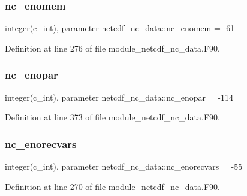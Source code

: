 \subsubsection{\texorpdfstring{nc\+\_\+enomem}{nc\_enomem}}
{\footnotesize\ttfamily integer(c\+\_\+int), parameter netcdf\+\_\+nc\+\_\+data\+::nc\+\_\+enomem = -\/61}



Definition at line 276 of file module\+\_\+netcdf\+\_\+nc\+\_\+data.\+F90.

\mbox{\label{namespacenetcdf__nc__data_aef244b9b47636b8dbe5895eca0b18136}} 
\subsubsection{\texorpdfstring{nc\+\_\+enopar}{nc\_enopar}}
{\footnotesize\ttfamily integer(c\+\_\+int), parameter netcdf\+\_\+nc\+\_\+data\+::nc\+\_\+enopar = -\/114}



Definition at line 373 of file module\+\_\+netcdf\+\_\+nc\+\_\+data.\+F90.

\mbox{\label{namespacenetcdf__nc__data_ac9cf156c3357804270d95bef39921992}} 
\subsubsection{\texorpdfstring{nc\+\_\+enorecvars}{nc\_enorecvars}}
{\footnotesize\ttfamily integer(c\+\_\+int), parameter netcdf\+\_\+nc\+\_\+data\+::nc\+\_\+enorecvars = -\/55}



Definition at line 270 of file module\+\_\+netcdf\+\_\+nc\+\_\+data.\+F90.

\mbox{\label{namespacenetcdf__nc__data_adedcd537ac75b8f3ea97ee278f7a61f9}} 
